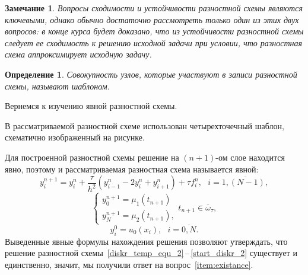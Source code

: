 \documentclass[11pt,a4paper,twoside]{report}
\numberwithin{equation}{section}
\newtheorem*{definition}{Определение}
\theoremstyle{definition}
\theoremstyle{plain}
\newtheorem*{note*}{Замечание}
\begin{document}
%
\begin{note*}
%
    Вопросы сходимости и устойчивости разностной схемы
    являются ключевыми, однако обычно достаточно рассмотреть только
    один из этих двух вопросов: в конце курса будет доказано, что из устойчивости
    разностной схемы следует ее сходимость к решению исходной задачи при условии,
    что разностная схема аппроксимирует исходную задачу.
%
\end{note*}
%

%
\begin{definition}
%
    Совокупность узлов, которые участвуют в записи разностной схемы, называют шаблоном.
%
\end{definition}
%
Вернемся к изучению явной разностной схемы.

В рассматриваемой разностной схеме использован четырехточечный шаблон, схематично
изображенный на рисунке.

\begin{figure}[H]
\centering
{}
\end{figure}
%

Для построенной разностной схемы решение на $(n+1)$-ом слое находится явно,
поэтому и рассматриваемая разностная схема называется явной:
%
$$
    y_i^{n+1} = y_i^n + \dfrac{\tau}{h^2} (y_{i-1}^n - 2y_i^n + y_{i+1}^n) +
    \tau f_i^n,~~~i = \overline{1, (N - 1),}
$$
%
$$
  \begin{cases}
    y_0^{n+1} = \mu_1(t_{n+1}) \\
    y_N^{n+1} = \mu_2(t_{n+1}),
  \end{cases}
  t_{n+1}\in \overline{\omega}_{\tau},
$$
%
$$
    y_i^0 = u_0(x_i),~~~i=\overline{0,N}.
$$
%
Выведенные явные формулы нахождения решения позволяют утверждать,
что решение разностной схемы~\eqref{diskr_temp_equ_2}\,--\,\eqref{start_diskr_2}
существует и единственно, значит, мы получили ответ
на вопрос~\eqref{item:existance}.
\end{document}

